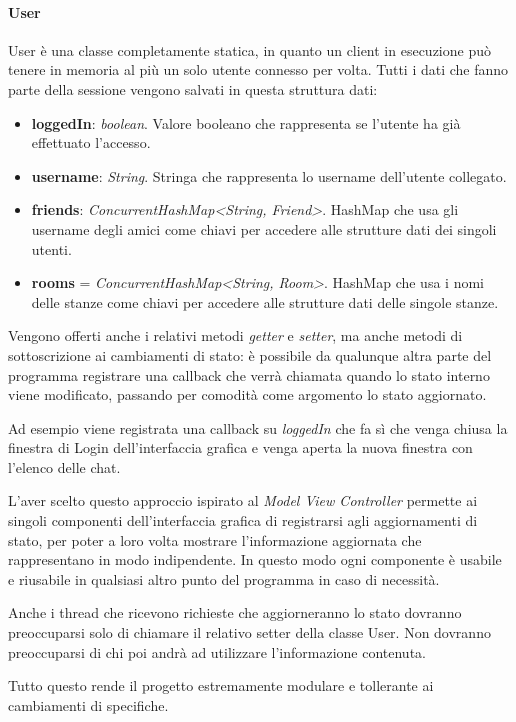 \paragraph{User}
User è una classe completamente statica, in quanto un client in esecuzione può tenere in memoria al più un solo utente connesso per volta. Tutti i dati che fanno parte della sessione vengono salvati in questa struttura dati:
\begin{itemize}
    \item \textbf{loggedIn}: \textit{boolean}. Valore booleano che rappresenta se l'utente ha già effettuato l'accesso.
    \item \textbf{username}: \textit{String}. Stringa che rappresenta lo username dell'utente collegato.
    \item \textbf{friends}: \textit{ConcurrentHashMap<String, Friend>}. HashMap che usa gli username degli amici come chiavi per accedere alle strutture dati dei singoli utenti.
    \item \textbf{rooms} = \textit{ConcurrentHashMap<String, Room>}. HashMap che usa i nomi delle stanze come chiavi per accedere alle strutture dati delle singole stanze.
\end{itemize}

Vengono offerti anche i relativi metodi \textit{getter} e \textit{setter}, ma anche metodi di sottoscrizione ai cambiamenti di stato: è possibile da qualunque altra parte del programma registrare una callback che verrà chiamata quando lo stato interno viene modificato, passando per comodità come argomento lo stato aggiornato.

Ad esempio viene registrata una callback su \textit{loggedIn} che fa sì che venga chiusa la finestra di Login dell'interfaccia grafica e venga aperta la nuova finestra con l'elenco delle chat.

\noindent L'aver scelto questo approccio ispirato al \textit{Model View Controller} permette ai singoli componenti dell'interfaccia grafica di registrarsi agli aggiornamenti di stato, per poter a loro volta mostrare l'informazione aggiornata che rappresentano in modo indipendente. In questo modo ogni componente è usabile e riusabile in qualsiasi altro punto del programma in caso di necessità.

Anche i thread che ricevono richieste che aggiorneranno lo stato dovranno preoccuparsi solo di chiamare il relativo setter della classe User. Non dovranno preoccuparsi di chi poi andrà ad utilizzare l'informazione contenuta.

Tutto questo rende il progetto estremamente modulare e tollerante ai cambiamenti di specifiche.

